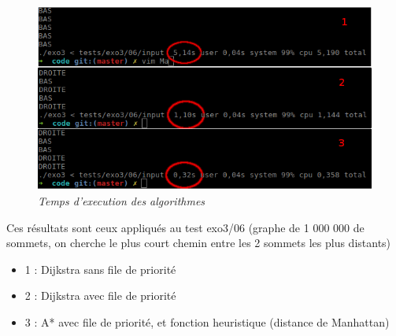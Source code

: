 \documentclass[10pt]{article}
\begin{document}
			\begin{figure}[H]
				\begin{center}
					\includegraphics[width=12cm,height=\textheight,keepaspectratio]{./images/performances.png}
				\end{center}
				\caption{\textit{Temps d'execution des algorithmes}}
			\end{figure}
			
			Ces résultats sont ceux appliqués au test exo3/06\newline
			(graphe de 1 000 000 de sommets, on cherche le plus court chemin entre les 2 sommets les plus distants)
			
			\begin{itemize}[label=-]
				\item 1 : Dijkstra sans file de priorité
				\item 2 : Dijkstra avec file de priorité
				\item 3 : A* avec file de priorité, et fonction heuristique (distance de Manhattan)
			\end{itemize}
			
	\newpage
\end{document}
